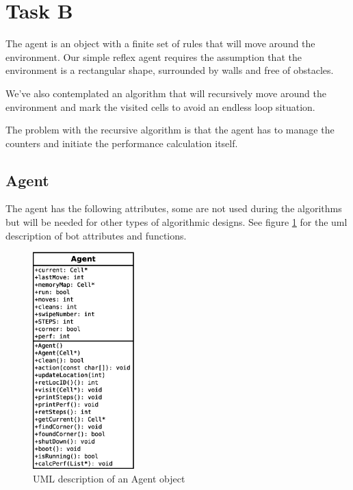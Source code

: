 
\section{Task B}
The agent is an object with a finite set of rules that will move around the
environment.  Our simple reflex agent requires the assumption that the
environment is a rectangular shape, surrounded by walls and free of obstacles.

We've also contemplated an algorithm that will recursively move around the
environment and mark the visited cells to avoid an endless loop situation.

The problem with the recursive algorithm is that the agent has to manage the
counters and initiate the performance calculation itself.

\subsection{Agent}
The agent has the following attributes, some are not used during the algorithms
but will be needed for other types of algorithmic designs. See figure
\ref{fig:agent_uml} for the uml description of bot attributes and functions.

\begin{figure}[h] \label{fig:agent_uml}	\centering
\includegraphics[width=0.35\textwidth]{agent_um}
\caption{UML description of an Agent object}
\end{figure}

